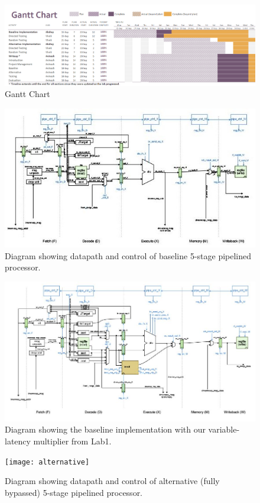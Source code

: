 \documentclass[10pt]{article}
\begin{document}
\begin{figure}[b]
\centering
\includegraphics[scale=0.5, angle=90]{gantt}
\caption{Gantt Chart}
\label{fig:gantt}
\end{figure}



\begin{figure}[b]
\centering
\includegraphics[scale=1.1]{baseline}
\caption{Diagram showing datapath and control of baseline 5-stage pipelined processor.}
\label{fig:baseline}
\end{figure}


\begin{figure}[b]
\centering
\includegraphics[scale=0.75]{baselinemult}
\caption{Diagram showing the baseline implementation with our variable-latency multiplier from Lab1.}
\label{fig:baselinemult}
\end{figure}



\begin{figure}[b]
\centering
\texttt{[image: alternative]}
\caption{Diagram showing datapath and control of alternative (fully bypassed) 5-stage pipelined processor.}
\label{fig:alt}
\end{figure}
\end{document}
